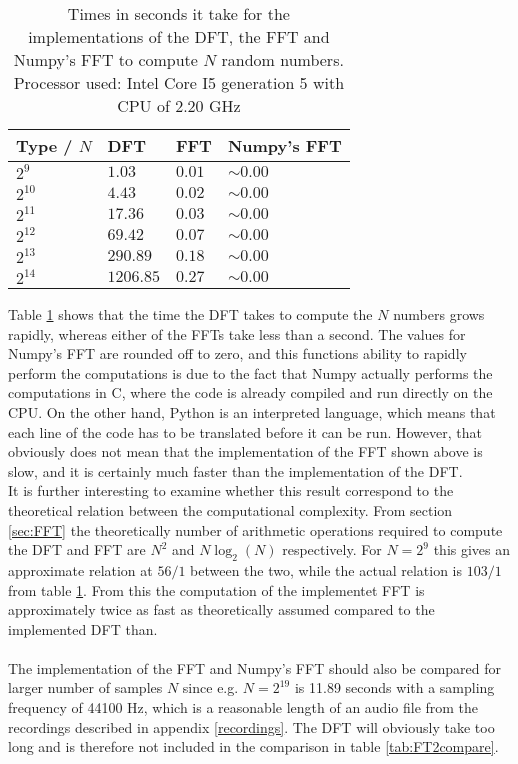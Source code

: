 \begin{table}[H]
\centering
\begin{tabular}{|l|l|l|l|}
\hline
Type / $N$ & DFT	   & FFT 	 & Numpy's FFT \\ \hline
$2^9$  	   & $1.03$    & $0.01$  & $\sim 0.00$ \\ \hline
$2^{10}$   & $4.43$    & $0.02$  & $\sim 0.00$ \\ \hline
$2^{11}$   & $17.36$   & $0.03$  & $\sim 0.00$ \\ \hline
$2^{12}$   & $69.42$   & $0.07$  & $\sim 0.00$ \\ \hline
$2^{13}$   & $290.89$  & $0.18$  & $\sim 0.00$ \\ \hline
$2^{14}$   & $1206.85$ & $0.27$  & $\sim 0.00$ \\ \hline
\end{tabular}
\caption{Times in seconds it take for the implementations of the DFT, the FFT and Numpy's FFT to compute $N$ random numbers. Processor used: Intel Core I5 generation 5 with CPU of 2.20 GHz}
\label{tab:FTcompare}
\end{table}

Table \ref{tab:FTcompare} shows that the time the DFT takes to compute the $N$ numbers grows rapidly, whereas either of the FFTs take less than a second. The values for Numpy's FFT are rounded off to zero, and this functions ability to rapidly perform the computations is due to the fact that Numpy actually performs the computations in C, where the code is already compiled and run directly on the CPU. On the other hand, Python is an interpreted language, which means that each line of the code has to be translated before it can be run. However, that obviously does not mean that the implementation of the FFT shown above is slow, and it is certainly much faster than the implementation of the DFT. \\
It is further interesting to examine whether this result correspond to the theoretical relation between the computational complexity. From section \ref{sec:FFT} the theoretically number of arithmetic operations required to compute the DFT and FFT are $N^2$ and $N\log_2(N)$ respectively. For $N=2^9$ this gives an approximate relation at $56/1$ between the two, while the actual relation is $103/1$ from table \ref{tab:FTcompare}. From this the computation of the implementet FFT is approximately twice as fast as theoretically assumed compared to the implemented DFT than. \\
\\
The implementation of the FFT and Numpy's FFT should also be compared for larger number of samples $N$ since e.g. $N = 2^{19}$ is 11.89 seconds with a sampling frequency of 44100 Hz, which is a reasonable length of an audio file from the recordings described in appendix \ref{recordings}. The DFT will obviously take too long and is therefore not included in the comparison in table \ref{tab:FT2compare}.

